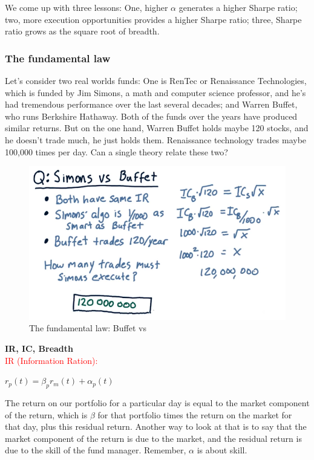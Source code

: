 \documentclass[12pt]{article}
\begin{document}
We come up with three lessons: One, higher $\alpha$ generates a higher Sharpe ratio; two, more execution opportunities provides a higher Sharpe ratio; three, Sharpe ratio grows as the square root of breadth. 

\subsubsection{The fundamental law}

Let's consider two real worlds funds: One is RenTec or Renaissance Technologies, which is funded by Jim Simons, a math and computer science professor, and he's had tremendous performance over the last several decades; and Warren Buffet, who runs Berkshire Hathaway. Both of the funds over the years have produced similar returns. But on the one hand, Warren Buffet holds maybe 120 stocks, and he doesn't trade much, he just holds them. Renaissance technology trades maybe 100,000 times per day. Can a single theory relate these two? \\[6pt]

\begin{figure}[!ht]
\centering
\includegraphics[scale=0.4]{fig/fig64}
\caption{The fundamental law: Buffet vs }
\end{figure}

\noindent
\textbf{IR, IC, Breadth} \\ [8pt]
\textcolor{red}{IR (Information Ration):}

\begin{centering}
$r_p(t) = \beta_pr_m(t) + \alpha_p(t)$ \\
\end{centering}

The return on our portfolio for a particular day is equal to the market component of the return, which is $\beta$ for that portfolio times the return on the market for that day, plus this residual return. Another way to look at that is to say that the market component of the return is due to the market, and the residual return is due to the skill of the fund manager. Remember, $\alpha$ is about skill.
\end{document}
